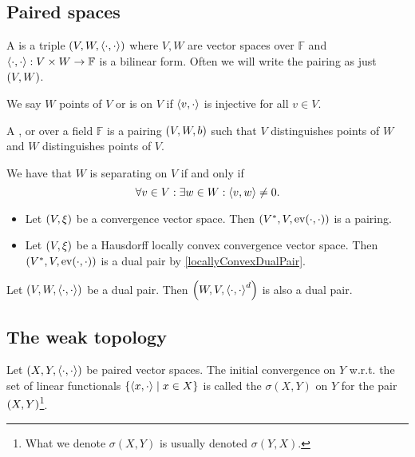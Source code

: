\subsection{Paired spaces}
\begin{definition}
A  is a triple $\left( V,W, \left\langle \cdot,\cdot \right\rangle \right)$ where $V,W$ are vector spaces over $\mathbb{F}$ and $\left\langle \cdot,\cdot \right\rangle: V\times W\to \mathbb{F}$ is a bilinear form. Often we will write the pairing as just $\left( V,W \right)$.

We say $W$  points of $V$ or is  on $V$ if $\left\langle v,\cdot \right\rangle$ is injective for all $v\in V$.

A ,  or  over a field $\mathbb{F}$ is a pairing $\left( V,W, b \right)$ such that $V$ distinguishes points of $W$ and $W$ distinguishes points of $V$.
\end{definition}
We have that $W$ is separating on $V$ \textup{if and only if}
\[ \forall v\in V: \exists w\in W: \left\langle v,w \right\rangle \neq 0. \]

\begin{example}
\begin{itemize}
\item Let $\left( V, \xi \right)$ be a convergence vector space. Then $\left( {V}^*, V, \operatorname{ev}(\cdot,\cdot) \right)$ is a pairing.
\item Let $\left( V,\xi \right)$ be a Hausdorff locally convex convergence vector space. Then $\left( {V}^*, V, \operatorname{ev}(\cdot,\cdot) \right)$ is a dual pair by \ref{locallyConvexDualPair}.
\end{itemize}
\end{example}

\begin{lemma}
Let $\left( V,W,\left\langle \cdot,\cdot \right\rangle \right)$ be a dual pair. Then $\left( W,V,\left\langle \cdot,\cdot \right\rangle^d \right)$ is also a dual pair.
\end{lemma}

\subsection{The weak topology}
\begin{definition}
Let $(X,Y,\left\langle \cdot,\cdot \right\rangle)$ be paired vector spaces. 
The initial convergence on $Y$ w.r.t. the set of linear functionals $\left\{ \left\langle x,\cdot \right\rangle \;\middle|\; x\in X \right\}$ is called the  $\sigma(X,Y)$ on $Y$ for the pair $\left( X,Y \right)$\footnote{What we denote $\sigma(X,Y)$ is usually denoted $\sigma(Y,X)$.}.
\end{definition}


